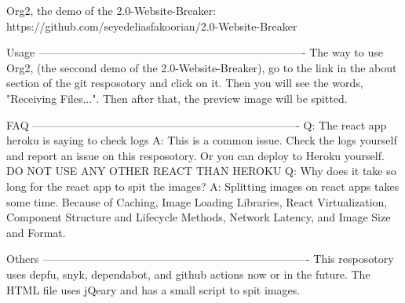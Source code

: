Org2, the demo of the 2.0-Website-Breaker:
https://github.com/seyedeliasfakoorian/2.0-Website-Breaker

Usage
-------------------------------------------------------------------------
The way to use Org2, (the seccond demo of the 2.0-Website-Breaker), 
go to the link in the about section of the git resposotory and click on
it. Then you will see the words, "Receiving Files...". Then after that, 
the preview image will be spitted.

FAQ
-------------------------------------------------------------------------
Q: The react app heroku is saying to check logs
A: This is a common issue. Check the logs yourself and report an issue
   on this resposotory. Or you can deploy to Heroku yourself.
   DO NOT USE ANY OTHER REACT THAN HEROKU
Q: Why does it take so long for the react app to spit the images?
A: Splitting images on react apps takes some time. Because of Caching,
   Image Loading Libraries, React Virtualization,
   Component Structure and Lifecycle Methods, Network Latency, and
   Image Size and Format.

Others
-------------------------------------------------------------------------
This resposotory uses depfu, snyk, dependabot, and github actions now
or in the future.
The HTML file uses jQeary and has a small script to spit images.

